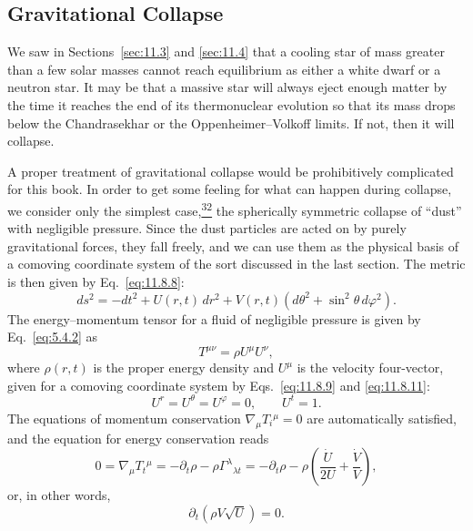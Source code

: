 
\subsection{Gravitational Collapse}\label{sec:11.9}

We saw in Sections~\ref{sec:11.3} and \ref{sec:11.4} that a cooling star of
mass greater than a few solar masses cannot reach equilibrium as either a
white dwarf or a neutron star. It may be that a massive star will always
eject enough matter by the time it reaches the end of its thermonuclear
evolution so that its mass drops below the Chandrasekhar or the
Oppenheimer--Volkoff limits. If not, then it will collapse.

A proper treatment of gravitational collapse would be prohibitively
complicated for this book. In order to get some feeling for what can happen
during collapse, we consider only the simplest
case,\hyperref[ch11-ref-32]{\textsuperscript{32}} the spherically symmetric
collapse of ``dust'' with negligible pressure. Since the dust particles are
acted on by purely gravitational forces, they fall freely, and we can use them
as the physical basis of a comoving coordinate system of the sort discussed
in the last section. The metric is then given by Eq.~\eqref{eq:11.8.8}:
\begin{equation}
  ds^2
  =
  -dt^2+U(r,t)\,dr^2
  +V(r,t)(d\theta^2+\sin^2\theta\,d\varphi^2).
  \tag{11.9.1}\label{eq:11.9.1}
\end{equation}
The energy--momentum tensor for a fluid of negligible pressure is given by
Eq.~\eqref{eq:5.4.2} as
\begin{equation}
  T^{\mu\nu}=\rho U^\mu U^\nu,
  \tag{11.9.2}\label{eq:11.9.2}
\end{equation}
where \(\rho(r,t)\) is the proper energy density and \(U^\mu\) is the velocity
four-vector, given for a comoving coordinate system by
Eqs.~\eqref{eq:11.8.9} and \eqref{eq:11.8.11}:
\begin{equation}
  U^r=U^\theta=U^\varphi=0,\qquad U^t=1.
  \tag{11.9.3}\label{eq:11.9.3}
\end{equation}
The equations of momentum conservation
\(\nabla_\mu T_i{}^\mu=0\) are automatically satisfied, and the equation for
energy conservation reads
\[
  0=\nabla_\mu T_t{}^\mu
  =
  -\partial_t\rho-\rho\Gamma^\lambda{}_{\lambda t}
  =
  -\partial_t\rho
  -\rho\left(\frac{\dot U}{2U}+\frac{\dot V}{V}\right),
\]
or, in other words,
\begin{equation}
  \partial_t\!\left(\rho V\sqrt U\right)=0.
  \tag{11.9.4}\label{eq:11.9.4}
\end{equation}

